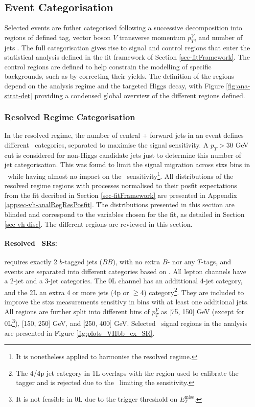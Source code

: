 \clearpage 
\subsection{Event Categorisation}\label{sec-eventCat}
Selected events are futher categorised following a successive decomposition into regions of defined tag, vector boson $V$ transverse momentum $p_T^V$, and number of jets \nj. The full categorisation gives rise to signal and control regions that enter the statistical analysis defined in the fit framework of Section \ref{sec-fitFramework}. The control regions are defined to help constrain the modelling of specific backgrounds, such as by correcting their yields. The definition of the regions depend on the analysis regime and the targeted Higgs decay, with Figure \ref{fig:ana-strat-det} providing a condensed global overview of the different regions defined.

\subsubsection{Resolved Regime Categorisation}
In the resolved regime, the number of central + forward jets in an event defines different \nj\ categories, separated to maximise the signal sensitivity. A $p_T > 30$ GeV cut is considered for non-Higgs candidate jets just to determine this number of jet categorisation. This was found to limit the signal migration across \gls{stxs} bins in \vhb\ while having almost no impact on the \vhc\ sensitivity\footnote{It is nonetheless applied to harmonise the resolved regime.}. All distributions of the resolved regime regions with processes normalised to their posfit expectations from the fit decribed in Section \ref{sec-fitFramework} are presented in Appendix \ref{appsec-vh-analRegResPosfit}. The distributions presented in this section are blinded and correspond to the variables chosen for the fit, as detailed in Section \ref{sec-vh-disc}. The different regions are reviewed in this section.

\paragraph{Resolved \boldvhb\ SRs:} requires exactly 2 $b$-tagged jets ($BB$), with no extra $B$- nor any $T$-tags, and events are separated into different categories based on \nj. All lepton channels have a 2-jet and a 3-jet categories. The 0L channel has an addittional 4-jet category, and the 2L an extra 4 or more jets (4p or $\geq$4) category\footnote{The 4/4p-jet category in 1L overlaps with the region used to calibrate the tagger and is rejected due to the \ttb\ limiting the sensitivity.}. They are included to improve the \gls{stxs} measurements sensitivy in bins with at least one additional jets. All regions are further split into different bins of $p_T^V$ as [75, 150] GeV (except for 0L\footnote{It is not feasible in 0L due to the trigger threshold on $E_T^{\textrm{miss}}$.}), [150, 250] GeV, and [250, 400] GeV. Selected \vhb\ signal regions in the analysis are presented in Figure \ref{fig:plots_VHbb_ex_SR}. %

